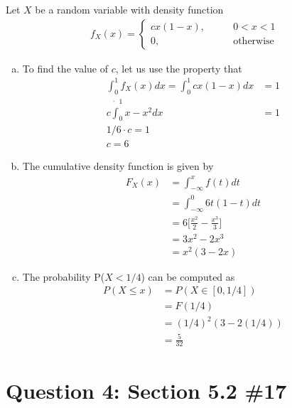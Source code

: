 \documentclass[11pt, oneside]{article}   	%
\begin{document}
Let $X$ be a random variable with density function
\begin{align*}
		f_X(x) = \begin{cases}
					cx(1-x), \qquad & 0 < x< 1 \\
					0, & \text{otherwise}
				\end{cases}
	\end{align*}
\begin{enumerate}[(a)]
	\item To find the value of $c$, let us use the property that	
	\begin{align*}
		\int_{0}^1 f_X(x) dx = \int_0^1 cx(1-x) dx & = 1 \\
		c \dot \int_0^1 x-x^2 dx & = 1 \\
		1/6 \cdot c = 1 \\
		c = 6
	\end{align*}
	\item The cumulative density function is given by
	\begin{align*}
		F_X(x) & = \int_{-\infty}^x f(t) dt \\
		& = \int_{-\infty}^0 6t(1-t) dt \\
		& = 6 \Big[\frac{x^2}{2}-\frac{x^3}{3}\Big] \\
		& =3x^2-2x^3 \\
		& = x^2(3-2x)
	\end{align*}
	\item The probability P($X < 1/4$) can be computed as
	\begin{align*}
		P(X \leq x) & = P(X \in [0, 1/4]) \\
		& = F(1/4)\\
		& = (1/4)^2(3-2(1/4)) \\
		& =\frac{5}{32}
	\end{align*}
\end{enumerate}


\section*{Question 4: Section 5.2 \#17}
\end{document}
